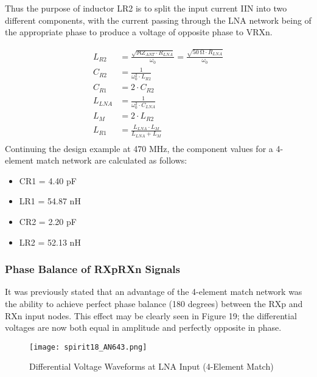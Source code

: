         Thus the purpose of inductor LR2 is to split the input current IIN into two different components, 
        with the current passing through the LNA network being of the appropriate phase to produce a voltage 
        of opposite phase to VRXn.
        
        \begin{align}
          L_{R2}  &= \frac{\sqrt{\Re{Z_{ANT}}\cdot R_{LNA}}}{\omega_0} 
                   = \frac{\sqrt{\qty{50}{\ohm}\cdot R_{LNA}}}{\omega_0}  \label{EXP001:eq_spirit20}      \\ 
          C_{R2}  &= \frac{1}{\omega_0^2\cdot L_{R2}}                    \label{EXP001:eq_spirit21}      \\ 
          C_{R1}  &= 2\cdot C_{R2}                                       \label{EXP001:eq_spirit22}      \\ 
          L_{LNA} &= \frac{1}{\omega_0^2\cdot C_{LNA}}                   \label{EXP001:eq_spirit23}      \\ 
          L_{M}   &= 2\cdot L_{R2}                                       \label{EXP001:eq_spirit24}      \\ 
          L_{R1}  &= \frac{L_{LNA}\cdot L_M}{L_{LNA} + L_M}              \label{EXP001:eq_spirit25} \\
        \end{align}
        Continuing the design example at 470 MHz, the component values for a 4-element match network are 
        calculated as follows:
        \begin{itemize}
          \item CR1 = 4.40 pF
          \item LR1 = 54.87 nH
          \item CR2 = 2.20 pF
          \item LR2 = 52.13 nH          
        \end{itemize}
        
      \subsubsection{Phase Balance of RXp\/RXn Signals}
        It was previously stated that an advantage of the 4-element match network was the ability to achieve 
        perfect phase balance (180 degrees) between the RXp and RXn input nodes. This effect may be clearly 
        seen in Figure 19; the differential voltages are now both equal in amplitude and perfectly opposite 
        in phase.
        
        \begin{figure}[ht!] %
          \centering
          \texttt{[image: spirit18\_AN643.png]}
          \caption{Differential Voltage Waveforms at LNA Input (4-Element Match)}
          \label{EXP001:fig_spirit19}
        \end{figure}
        

